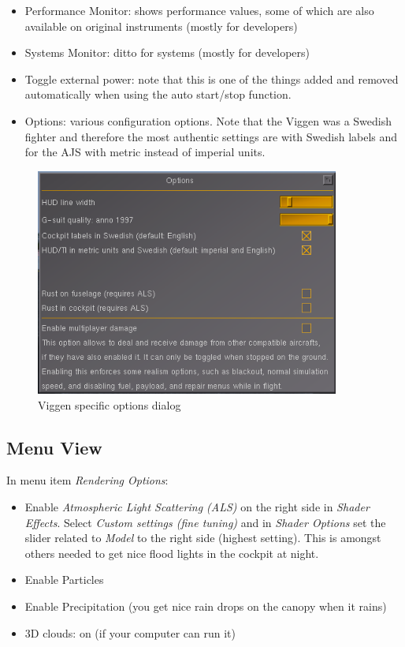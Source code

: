 \begin{itemize}
\item Performance Monitor: shows performance values, some of which are also available on original instruments (mostly for developers)
\item Systems Monitor: ditto for systems (mostly for developers)
\item Toggle external power: note that this is one of the things added and removed automatically when using the auto start/stop function.
\item Options: various configuration options. Note that the Viggen was a Swedish fighter and therefore the most authentic settings are with Swedish labels and for the AJS with metric instead of imperial units.
\end{itemize}

\begin{figure}[h]
\centering
 \includegraphics[width=10cm]{images/fg_option_config.png}
 \caption{Viggen specific options dialog}
\end{figure}

\subsection{Menu View}
In menu item \emph{Rendering Options}:
\begin{itemize}
\item Enable \emph{Atmospheric Light Scattering (ALS)} on the right side in \emph{Shader Effects}. Select \emph{Custom settings (fine tuning)} and in \emph{Shader Options} set the slider related to \emph{Model} to the right side (highest setting). This is amongst others needed to get nice flood lights in the cockpit at night.
\item Enable Particles
\item Enable Precipitation (you get nice rain drops on the canopy when it rains)
\item 3D clouds: on (if your computer can run it)
\end{itemize}

